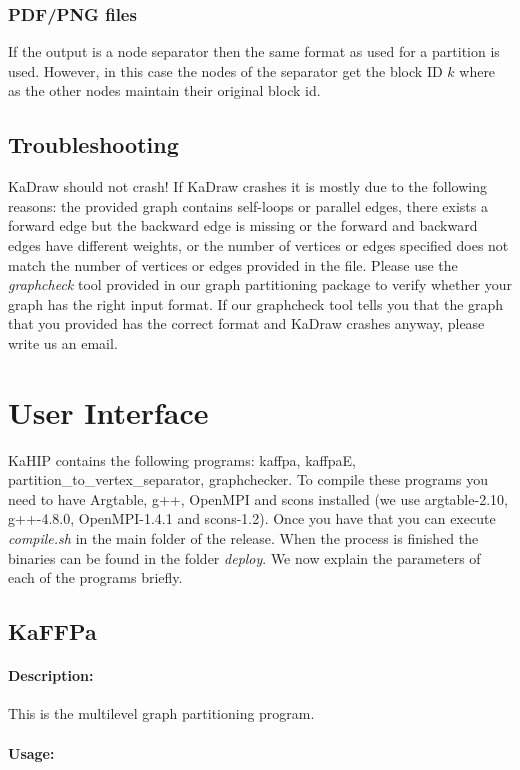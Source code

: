\documentclass[11pt]{article}
\begin{document}
\subsubsection{PDF/PNG files}
If the output is a node separator then the same format as used for a partition is used. However, in this case the nodes of the separator get the block ID $k$ where as the other nodes maintain their original block id. 
\subsection{Troubleshooting}
KaDraw should not crash! If KaDraw crashes it is mostly due to the following reasons: the provided graph contains self-loops or parallel edges, there exists a forward edge but the backward edge is missing or the forward and backward edges have different weights, or the number of vertices or edges specified does not match the number of vertices or edges provided in the file.
Please use the \emph{graphcheck} tool provided in our graph partitioning package to verify whether your graph has the right input format. If our graphcheck tool tells you that the graph that you provided has the correct format and KaDraw crashes anyway, please write us an email.

\vfill
\pagebreak
\section{User Interface}
KaHIP contains the following programs: kaffpa, kaffpaE, partition\_to\_vertex\_separator, graphchecker. To compile these programs you need to have Argtable, g++, OpenMPI and scons installed (we use argtable-2.10, g++-4.8.0, OpenMPI-1.4.1 and scons-1.2). Once you have that you can execute \emph{compile.sh} in the main folder of the release. When the process is finished the binaries can be found in the folder \emph{deploy}. We now explain the parameters of each of the programs briefly.
\subsection{KaFFPa}
\paragraph*{Description:} This is the multilevel graph partitioning program. 
\paragraph*{Usage:\\} 
\end{document}

